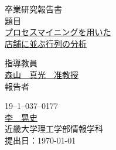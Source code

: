 \documentclass{jsarticle}
\begin{document}
 
\begin{center}
\vspace*{1cm}
\large
{\LARGE 卒業研究報告書}\\
\vspace*{0.8cm}
題目\\
\vspace*{1cm}
{\Huge \underline{プロセスマイニングを用いた} \\ \underline{店舗に並ぶ行列の分析}}
\vspace{3mm}
 
\vspace*{3cm}
指導教員\\
\vspace*{0.3cm}
\underline{\LARGE 森山　真光　准教授}\\
\vspace*{3cm}
報告者\\
\vspace*{0.3cm}
 
{19--1--037--0177}\\
\vspace*{0.3cm}
\underline{\Huge 李　晃史}\\
\vspace*{0.5cm}
近畿大学理工学部情報学科\\
\vspace*{2cm}
提出日：\today 
\end{center}
\end{document}
